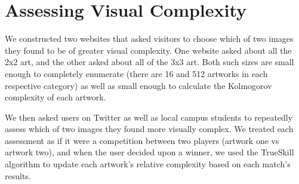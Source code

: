 \section{Assessing Visual Complexity}

We constructed two websites that asked visitors to choose which of two images
they found to be of greater visual complexity.  One website asked about all the
2x2 art, and the other asked about all of the 3x3 art.  Both such sizes are
small enough to completely enumerate (there are 16 and 512 artworks in each
respective category) as well as small enough to calculate the Kolmogorov
complexity of each artwork.

We then asked users on Twitter as well as local campus students to repeatedly
assess which of two images they found more visually complex.  We treated each
assessment as if it were a competition between two players (artwork one vs
artwork two), and when the user decided upon a winner, we used the TrueSkill
algorithm to update each artwork's relative complexity based on each match's
results.

